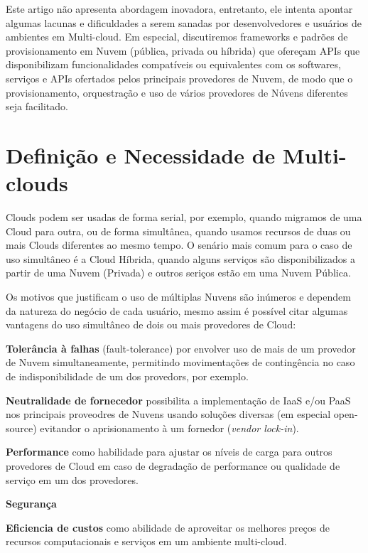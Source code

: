 \documentclass[12pt]{article}
\begin{document}
	    Este artigo não apresenta abordagem inovadora, entretanto, ele intenta apontar algumas lacunas e dificuldades a serem sanadas por desenvolvedores e usuários de ambientes em Multi-cloud. Em especial, discutiremos frameworks e padrões de provisionamento em Nuvem (pública, privada ou híbrida) que ofereçam APIs que disponibilizam funcionalidades compatíveis ou equivalentes com os softwares,  serviços e APIs ofertados pelos principais provedores de Nuvem, de modo que o provisionamento, orquestração e uso de vários provedores de Núvens diferentes seja facilitado.
		
	\section{Definição e Necessidade de Multi-clouds}
	
	Clouds podem ser usadas de forma serial, por exemplo, quando migramos de uma Cloud para outra, ou de forma simultânea, quando usamos recursos de duas ou mais Clouds diferentes ao mesmo tempo. O senário mais comum para o caso de uso simultâneo é a Cloud Híbrida, quando alguns serviços são disponibilizados a partir de uma Nuvem (Privada) e outros seriços estão em uma Nuvem Pública.
	
	Os motivos que justificam o uso de múltiplas Nuvens são inúmeros e dependem da natureza do negócio de cada usuário, mesmo assim é possível citar algumas vantagens do uso simultâneo de dois ou mais provedores de Cloud:
	
	\textbf{Tolerância à falhas} (fault-tolerance) por envolver uso de mais de um provedor de Nuvem simultaneamente, permitindo movimentações de contingência no caso de indisponibilidade de um dos provedors, por exemplo.
	
	\textbf{Neutralidade de fornecedor} possibilita a implementação de IaaS e/ou PaaS nos principais proveodres de Nuvens usando soluções diversas (em especial open-source)  evitandor o aprisionamento à um fornedor (\textit{vendor lock-in}).
	
	\textbf{Performance} como habilidade para ajustar os níveis de carga para outros provedores de Cloud em caso de degradação de performance ou qualidade de serviço em um dos provedores.
	
	\textbf{Segurança}
	
	\textbf{Eficiencia de custos} como abilidade de aproveitar os melhores preços de recursos computacionais e serviços em um ambiente multi-cloud.
	
\end{document}

